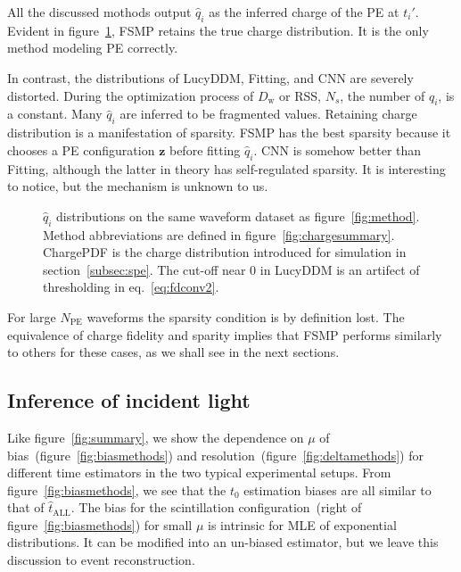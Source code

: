 All the discussed mothods output $\hat{q}_i$ as the inferred charge of the PE at $t_i'$.  Evident in figure~\ref{fig:recchargehist}, FSMP retains the true charge distribution.  It is the only method modeling PE correctly.

In contrast, the distributions of LucyDDM, Fitting, and CNN are severely distorted.  During the optimization process of $D_\mathrm{w}$ or RSS, $N_s$, the number of $q_i$, is a constant. Many $\hat{q}_i$ are inferred to be fragmented values.  Retaining charge distribution is a manifestation of sparsity.  FSMP has the best sparsity because it chooses a PE configuration $\bm{z}$ before fitting $\hat{q}_i$.  CNN is somehow better than Fitting, although the latter in theory has self-regulated sparsity.  It is interesting to notice, but the mechanism is unknown to us.

\begin{figure}[H]
  \centering
  \resizebox{0.6\textwidth}{!}{}
  \caption{\label{fig:recchargehist} $\hat{q}_i$ distributions on the same waveform dataset as figure~\ref{fig:method}.  Method abbreviations are defined in figure~\ref{fig:chargesummary}. ChargePDF is the charge distribution introduced for simulation in section~\ref{subsec:spe}. The cut-off near 0 in LucyDDM is an artifect of thresholding in eq.~\eqref{eq:fdconv2}.}
\end{figure}

For large $N_\mathrm{PE}$ waveforms the sparsity condition is by definition lost.  The equivalence of charge fidelity and sparity implies that FSMP performs similarly to others for these cases, as we shall see in the next sections.

\subsection{Inference of incident light}
\label{subsec:timeresolution}

Like figure~\ref{fig:summary}, we show the dependence on $\mu$ of bias~(figure~\ref{fig:biasmethods}) and resolution~(figure~\ref{fig:deltamethods}) for different time estimators in the two typical experimental setups.  From figure~\ref{fig:biasmethods}, we see that the $t_0$ estimation biases are all similar to that of $\hat{t}_\mathrm{ALL}$. The bias for the scintillation configuration~(right of figure~\ref{fig:biasmethods}) for small $\mu$ is intrinsic for MLE of exponential distributions.  It can be modified into an un-biased estimator, but we leave this discussion to event reconstruction.

